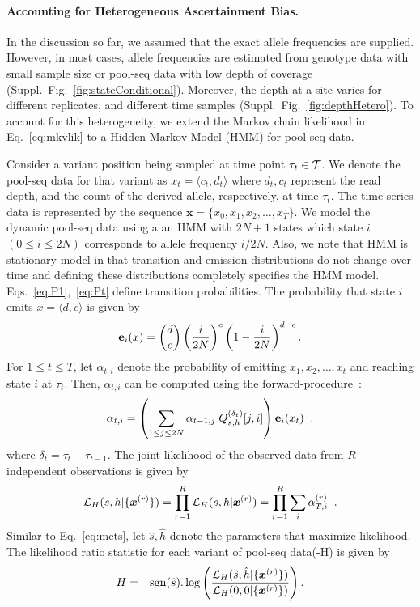 \paragraph{Accounting for Heterogeneous Ascertainment Bias.}
In the discussion so far, we assumed that the exact allele frequencies
are supplied. However, in most cases, allele frequencies are estimated
from genotype data with small sample size or pool-seq data with low
depth of coverage (Suppl.~Fig.~\ref{fig:stateConditional}).  Moreover,
the depth at a site varies for different replicates, and different
time samples (Suppl.~Fig.~\ref{fig:depthHetero}). To account for this
heterogeneity, we extend the Markov chain likelihood in
Eq.~\ref{eq:mkvlik} to a Hidden Markov Model (HMM) for pool-seq data.

Consider a variant position being sampled at time point $\tau_t\in
{\cal T}$. We denote the pool-seq data for that variant as $x_t =
\langle c_t,d_t \rangle$ where $d_t, c_t$ represent the read depth,
and the count of the derived allele, respectively, at time
$\tau_t$. The time-series data is represented by the sequence
$\bm{x}=\{x_0,x_1,x_2,\ldots,x_T\}$. We model the dynamic pool-seq
data using a an HMM with $2N+1$ states which state $i$ $(0\le i\le
2N)$ corresponds to allele frequency $i/2N$.  Also, we note that HMM
is stationary model in that transition and emission distributions do
not change over time and defining these distributions completely
specifies the HMM model. Eqs.~\ref{eq:P1},~\ref{eq:Pt} define
transition probabilities. The probability that state $i$ emits $
x=\langle d, c\rangle $ is given by
\begin{equation*}
{\bf e}_{i}(x) = {d \choose c} \left(\frac{i}{2N} \right)^c\left (1- 
\frac{i}{2N} \right)^{d-c}.
\end{equation*}
For $1\le t\le T$, let $\alpha_{t,i}$ denote the probability of
emitting $x_1,x_2,\ldots,x_t$ and reaching state $i$ at
$\tau_t$. Then, $\alpha_{t,i}$ can be computed using the
forward-procedure~\cite{durbin1998biological}:
\begin{equation}
  \alpha_{t,i} = \left( \sum_{1\le j\le 2N} 
  \alpha_{t-1,j}\;Q^{(\delta_t)}_{s,h}[j,i] \right) {\bf e}_{i}(x_t)\;\; .
  \label{eq:hmm}
\end{equation}
where $\delta_t=\tau_t-\tau_{t-1}$. The joint likelihood of the
observed data from $R$ independent observations is given by
\begin{equation}
  {\cal L}_{H}(s,h|\{\bm{x}^{(r)}\})=\prod_{r=1}^R{\cal L}_{H}(s,h|\bm{x}^{(r)}) = 
  \prod_{r=1}^R \sum_i\alpha_{T,i}^{(r)}\;\;.
  \label{eq:hmmlik}
\end{equation}
Similar to Eq.~\ref{eq:mcts}, let $\hat{s},\hat{h}$ denote the parameters that
maximize likelihood. The likelihood ratio statistic for
each variant of pool-seq data(\comale-H) is given by
\begin{eqnarray}
H &=& \operatorname{sgn} (\hat{s}). \log 
\left(\frac{{\cal L}_H(\hat{s},\hat{h}|\{\bm{x}^{(r)}\})}{{\cal L}_H(0,0|\{\bm{x}^{(r)}\})}\right).
\label{eq:hmmml}
\end{eqnarray}

